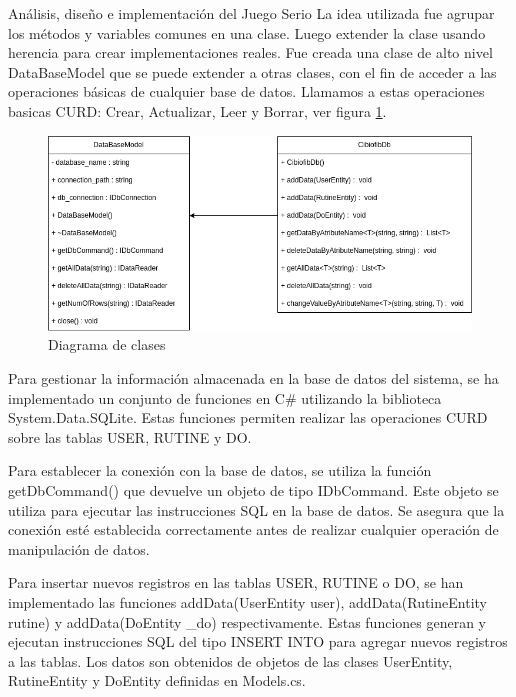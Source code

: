 \begin{thesischapter}{2} {Análisis, diseño e implementación del Juego Serio}
    \vspace{10pt}
    La idea utilizada fue agrupar los métodos y variables comunes en una clase. Luego extender la clase usando herencia para 
    crear implementaciones reales. Fue creada una clase de alto nivel DataBaseModel que se puede extender a otras clases, con el 
    fin de acceder a las operaciones básicas de cualquier base de datos. Llamamos a estas operaciones basicas CURD: Crear, 
    Actualizar, Leer y Borrar, ver figura \ref{fig: diagram-db}.
    \begin{figure}[ht]
        \centering
        \includegraphics[scale=0.5]{images/diagram-db.png}
        \caption{Diagrama de clases}
        \label{fig: diagram-db}
    \end{figure}

    Para gestionar la información almacenada en la base de datos del sistema, se ha implementado un conjunto de funciones en C\# utilizando la biblioteca 
    System.Data.SQLite. Estas funciones permiten realizar las operaciones CURD sobre las tablas USER, RUTINE y DO.
    
    
    Para establecer la conexión con la base de datos, se utiliza la función getDbCommand() que devuelve un objeto de tipo IDbCommand. Este objeto se utiliza para ejecutar las instrucciones SQL en 
    la base de datos. Se asegura que la conexión esté establecida correctamente antes de realizar cualquier operación de manipulación de datos.

    Para insertar nuevos registros en las tablas USER, RUTINE o DO, se han implementado las funciones addData(UserEntity user), addData(RutineEntity rutine) y addData(DoEntity \_do) respectivamente. 
    Estas funciones generan y ejecutan instrucciones SQL del tipo INSERT INTO para agregar nuevos registros a las tablas. Los datos son obtenidos de objetos de las clases UserEntity, RutineEntity y DoEntity
    definidas en Models.cs.


\end{thesischapter}
